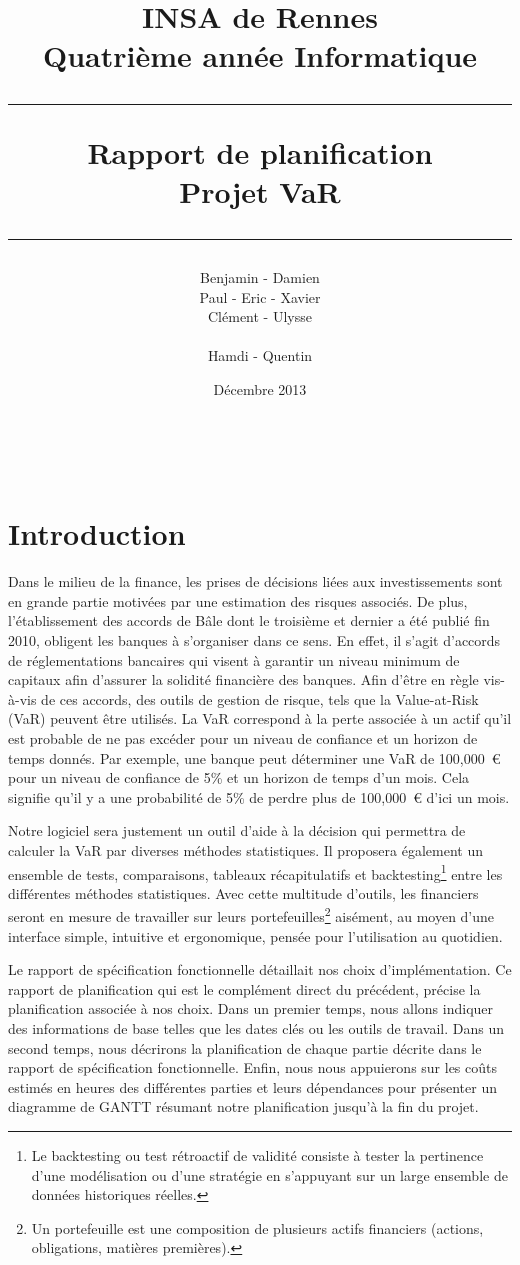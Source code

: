 \documentclass[a4paper]{report}
\title{INSA de Rennes \\ Quatrième année Informatique \\ \bigskip \hrule \bigskip Rapport de planification \\ \bigskip Projet VaR \bigskip \hrule}
\author{Benjamin \bsc{Bouguet} - Damien \bsc{Carduner} \\Paul \bsc{Chaignon} - Eric \bsc{Chauty} - Xavier \bsc{Fraboulet} \\ Clément \bsc{Gautrais} - Ulysse \bsc{Goarant} \\ ~~\\
Hamdi \bsc{Raissi} - Quentin \bsc{Giai Gianetto}}
\date{Décembre 2013}
\begin{document}
\maketitle

\thispagestyle{empty}
\newpage

~~
\thispagestyle{empty}
\newpage


\tableofcontents
\newpage


\chapter{Introduction}
Dans le milieu de la finance, les prises de décisions liées aux investissements sont en grande partie motivées par une estimation des risques associés. De plus, l'établissement des accords de Bâle dont le troisième et dernier a été publié fin 2010, obligent les banques à s'organiser dans ce sens. En effet, il s'agit d'accords de réglementations bancaires qui visent à garantir un niveau minimum de capitaux afin d'assurer la solidité financière des banques. Afin d'être en règle vis-à-vis de ces accords, des outils de gestion de risque, tels que la Value-at-Risk (VaR) peuvent être utilisés. La VaR correspond à la perte associée à un actif qu'il est probable de ne pas excéder pour un niveau de confiance et un horizon de temps donnés. Par exemple, une banque peut déterminer une VaR de 100,000~€ pour un niveau de confiance de 5\% et un horizon de temps d'un mois. Cela signifie qu'il y a une probabilité de 5\% de perdre plus de 100,000~€ d'ici un mois. 

Notre logiciel sera justement un outil d'aide à la décision qui permettra de calculer la VaR  par diverses méthodes statistiques. Il proposera également un ensemble de tests, comparaisons, tableaux récapitulatifs et backtesting\footnote{Le backtesting ou test rétroactif de validité consiste à tester la pertinence d'une modélisation ou d'une stratégie en s'appuyant sur un large ensemble de données historiques réelles.} entre les différentes méthodes statistiques. Avec cette multitude d'outils, les financiers seront en mesure de travailler sur leurs portefeuilles\footnote{Un portefeuille est une composition de plusieurs actifs financiers (actions, obligations, matières premières).} aisément, au moyen d’une interface simple, intuitive et ergonomique, pensée pour l'utilisation au quotidien.

Le rapport de spécification fonctionnelle détaillait nos choix d’implémentation. Ce rapport de planification qui est le complément direct du précédent, précise la planification associée à nos choix. Dans un premier temps, nous allons indiquer des informations de base telles que les dates clés ou les outils de travail. Dans un second temps, nous décrirons la planification de chaque partie décrite dans le rapport de spécification fonctionnelle. Enfin, nous nous appuierons sur les coûts estimés en heures des différentes parties et leurs dépendances pour présenter un diagramme de GANTT résumant notre planification jusqu’à la fin du projet.
\end{document}
